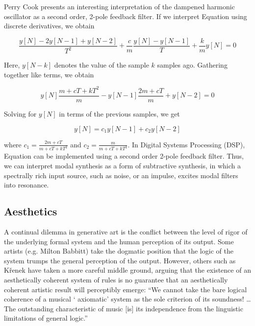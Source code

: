 Perry Cook presents an interesting interpretation of the dampened harmonic oscillator as a second order,
2-pole feedback filter. If we interpret Equation \cite{eq:dampedosc} using discrete derivatives, we obtain 

\begin{equation}
\frac{y[N] - 2y[N-1] + y[N-2]}{T^2} + \frac{c}{m} \frac{y[N] - y[N-1]}{T} + \frac{k}{m} y[N] = 0
\end{equation}

Here, $y[N - k]$ denotes the value of the sample $k$ samples ago. Gathering together like terms, we obtain

\begin{equation}
y[N] \frac{m + cT + kT^2}{m} - y[N-1] \frac{2m + cT}{m} + y[N-2] = 0
\end{equation}

Solving for $y[N]$ in terms of the previous samples, we get

\begin{equation}
\label{eq:linsys}
y[N] = c_1 y[N-1] + c_2 y[N-2]
\end{equation}

where $c_1 = \frac{2m + cT}{m + cT + kT^2}$ and $c_2 = \frac{m}{m + cT + kT^2}$. In Digital
Systems Processing (DSP), Equation \cite{eq:linsys} can be implemented using a second order 2-pole feedback filter. 
Thus, we can interpret modal synthesis as a form of subtractive synthesis, in which a spectrally rich input source, such as
noise, or an impulse, excites modal filters into resonance.

\subsection{Aesthetics}
A continual dilemma in generative art is the conflict between the level of 
rigor of the underlying formal system and the human perception of its output. 
Some artists (e.g. Milton Babbitt) take the dogmatic position that the logic 
of the system trumps the general perception of the output. \cite{babbitt1958cares}  
However, others such as K{\v{r}}enek have taken a more careful middle 
ground, arguing that the existence of an aesthetically coherent system of 
rules is no guarantee that an aesthetically coherent artistic result will 
perceptibly emerge: ``We cannot take the bare logical coherence of a musical `
axiomatic' system as the sole criterion of its soundness! \dots The 
outstanding characteristic of music [is] its independence from the linguistic 
limitations of general logic.'' \cite{kvrenek1939music}